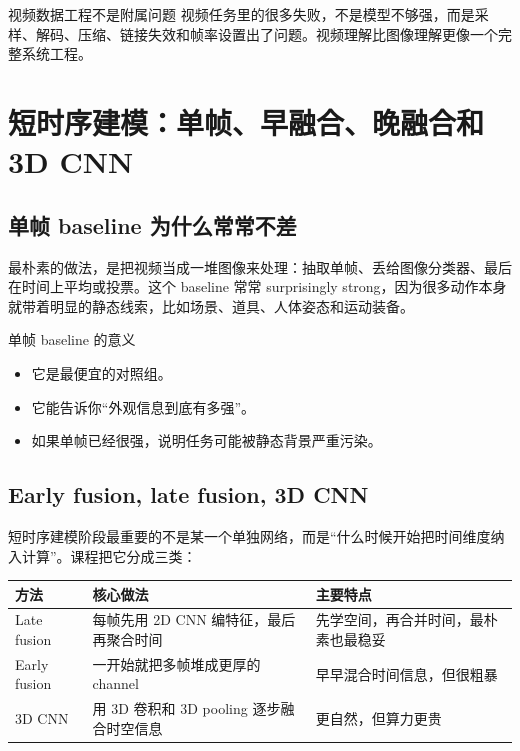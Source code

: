 \documentclass[a4paper]{article}
\begin{document}
\begin{warningbox}{视频数据工程不是附属问题}
视频任务里的很多失败，不是模型不够强，而是采样、解码、压缩、链接失效和帧率设置出了问题。视频理解比图像理解更像一个完整系统工程。
\end{warningbox}

\section{短时序建模：单帧、早融合、晚融合和 3D CNN}

\subsection{单帧 baseline 为什么常常不差}

最朴素的做法，是把视频当成一堆图像来处理：抽取单帧、丢给图像分类器、最后在时间上平均或投票。这个 baseline 常常 surprisingly strong，因为很多动作本身就带着明显的静态线索，比如场景、道具、人体姿态和运动装备。

\begin{importantbox}{单帧 baseline 的意义}
\begin{itemize}
    \item 它是最便宜的对照组。
    \item 它能告诉你“外观信息到底有多强”。
    \item 如果单帧已经很强，说明任务可能被静态背景严重污染。
\end{itemize}
\end{importantbox}

\subsection{Early fusion, late fusion, 3D CNN}

短时序建模阶段最重要的不是某一个单独网络，而是“什么时候开始把时间维度纳入计算”。课程把它分成三类：

\begin{center}
\begin{tabular}{p{2.8cm} p{4.3cm} p{4.0cm}}
\toprule
方法 & 核心做法 & 主要特点 \\
\midrule
Late fusion & 每帧先用 2D CNN 编特征，最后再聚合时间 & 先学空间，再合并时间，最朴素也最稳妥 \\
Early fusion & 一开始就把多帧堆成更厚的 channel & 早早混合时间信息，但很粗暴 \\
3D CNN & 用 3D 卷积和 3D pooling 逐步融合时空信息 & 更自然，但算力更贵 \\
\bottomrule
\end{tabular}
\end{center}
\end{document}
